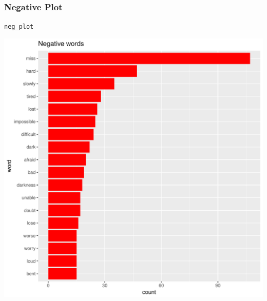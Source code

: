\documentclass[10pt]{beamer}\usepackage[]{graphicx}\usepackage[]{color}
\makeatletter
\def\maxwidth{ %
  \ifdim\Gin@nat@width>\linewidth
    \linewidth
  \else
    \Gin@nat@width
  \fi
}
\newcommand{\hlstd}[1]{\textcolor[rgb]{0.345,0.345,0.345}{#1}}%
\newenvironment{kframe}{%
 \def\at@end@of@kframe{}%
 \ifinner\ifhmode%
  \def\at@end@of@kframe{\end{minipage}}%
  \begin{minipage}{\columnwidth}%
 \fi\fi%
 \def\FrameCommand##1{\hskip\@totalleftmargin \hskip-\fboxsep
 \colorbox{shadecolor}{##1}\hskip-\fboxsep
     \hskip-\linewidth \hskip-\@totalleftmargin \hskip\columnwidth}%
 \MakeFramed {\advance\hsize-\width
   \@totalleftmargin\z@ \linewidth\hsize
   \@setminipage}}%
 {\par\unskip\endMakeFramed%
 \at@end@of@kframe}
\newenvironment{knitrout}{}{} %
\makeatother
\begin{document}
\begin{frame}[fragile]
  \frametitle{Negative Plot}
\begin{knitrout}
\color{fgcolor}\begin{kframe}
\begin{alltt}
\hlstd{neg_plot}
\end{alltt}
\end{kframe}
\includegraphics[width=\maxwidth]{figure/unnamed-chunk-14-1} 

\end{knitrout}

\end{frame}
\end{document}
